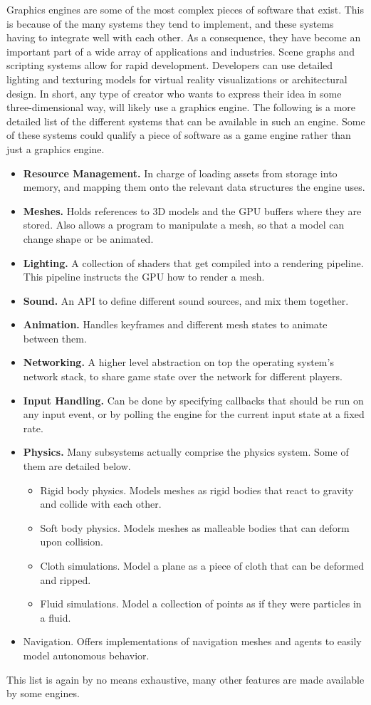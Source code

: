 
Graphics engines are some of the most complex pieces of software that exist.
This is because of the many systems they tend to implement,
and these systems having to integrate well with each other.
As a consequence,
they have become an important part of a wide array of applications and industries.
Scene graphs and scripting systems allow for rapid development.
Developers can use detailed lighting and texturing models for virtual reality visualizations or architectural design.
In short,
any type of creator who wants to express their idea in some three-dimensional way,
will likely use a graphics engine.
The following is a more detailed list of the different systems that can be available in such an engine.
Some of these systems could qualify a piece of software as a game engine rather than just a graphics engine.

\begin{itemize}
\item \textbf{Resource Management.}
  In charge of loading assets from storage into memory,
  and mapping them onto the relevant data structures the engine uses.
\item \textbf{Meshes.}
  Holds references to 3D models and the GPU buffers where they are stored.
  Also allows a program to manipulate a mesh,
  so that a model can change shape or be animated.
\item \textbf{Lighting.}
  A collection of shaders that get compiled into a rendering pipeline.
  This pipeline instructs the GPU how to render a mesh.
\item \textbf{Sound.}
  An API to define different sound sources, and mix them together.
\item \textbf{Animation.}
  Handles keyframes and different mesh states to animate between them.
\item \textbf{Networking.}
  A higher level abstraction on top the operating system's network stack,
  to share game state over the network for different players.
\item \textbf{Input Handling.}
  Can be done by specifying callbacks that should be run on any input event,
  or by polling the engine for the current input state at a fixed rate.
\item \textbf{Physics.}
  Many subsystems actually comprise the physics system.
  Some of them are detailed below.
  \begin{itemize}
  \item {Rigid body physics.}
    Models meshes as rigid bodies that react to gravity and collide with each other.
  \item {Soft body physics.}
    Models meshes as malleable bodies that can deform upon collision.
  \item {Cloth simulations.}
    Model a plane as a piece of cloth that can be deformed and ripped.
  \item {Fluid simulations.}
    Model a collection of points as if they were particles in a fluid.
  \end{itemize}
\item {Navigation.}
  Offers implementations of navigation meshes and agents to easily model autonomous behavior.
\end{itemize}

This list is again by no means exhaustive,
many other features are made available by some engines.
